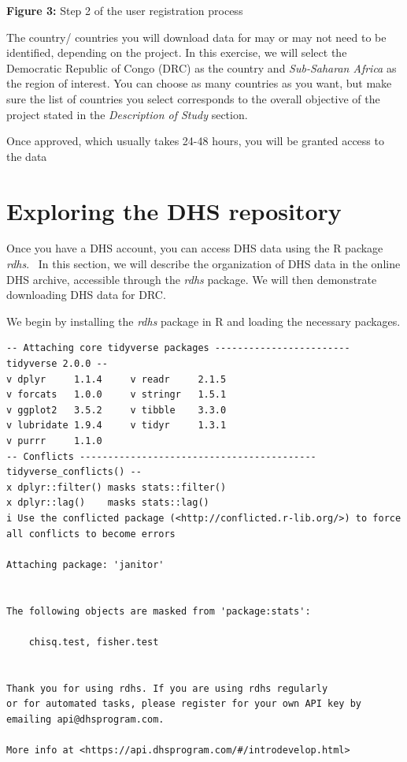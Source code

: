 \documentclass[
  letterpaper,
  DIV=11,
  numbers=noendperiod]{scrreprt}
\begin{document}
\textbf{Figure 3:} Step 2 of the user registration process

The country/ countries you will download data for may or may not need to
be identified, depending on the project. In this exercise, we will
select the Democratic Republic of Congo (DRC) as the country and
\emph{Sub-Saharan Africa} as the region of interest. You can choose as
many countries as you want, but make sure the list of countries you
select corresponds to the overall objective of the project stated in the
\emph{Description of Study} section.

Once approved, which usually takes 24-48 hours, you will be granted
access to the data


\chapter{\texorpdfstring{\textbf{Exploring the DHS
repository}}{Exploring the DHS repository}}\label{exploring-the-dhs-repository}

Once you have a DHS account, you can access DHS data using the R package
\emph{rdhs}.~ In this section, we will describe the organization of DHS
data in the online DHS archive, accessible through the \emph{rdhs}
package. We will then demonstrate downloading DHS data for DRC.

We begin by installing the \emph{rdhs} package in R and loading the
necessary packages.

\begin{verbatim}
-- Attaching core tidyverse packages ------------------------ tidyverse 2.0.0 --
v dplyr     1.1.4     v readr     2.1.5
v forcats   1.0.0     v stringr   1.5.1
v ggplot2   3.5.2     v tibble    3.3.0
v lubridate 1.9.4     v tidyr     1.3.1
v purrr     1.1.0     
-- Conflicts ------------------------------------------ tidyverse_conflicts() --
x dplyr::filter() masks stats::filter()
x dplyr::lag()    masks stats::lag()
i Use the conflicted package (<http://conflicted.r-lib.org/>) to force all conflicts to become errors

Attaching package: 'janitor'


The following objects are masked from 'package:stats':

    chisq.test, fisher.test


Thank you for using rdhs. If you are using rdhs regularly
or for automated tasks, please register for your own API key by
emailing api@dhsprogram.com. 

More info at <https://api.dhsprogram.com/#/introdevelop.html>
\end{verbatim}
\end{document}

